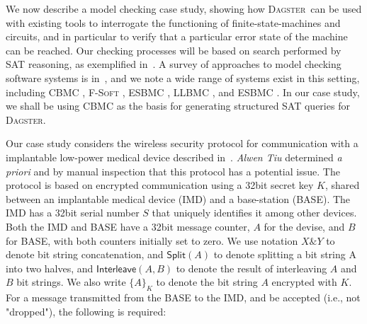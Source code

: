 \documentclass[10pt,a4paper,oneside,headinclude,footinclude,BCOR5mm]{scrartcl}
\newcommand{\dagster}{\textsc{Dagster}\xspace}
\begin{document}
We now describe a model checking case study, showing how \dagster\ can be used with existing tools to interrogate the functioning of finite-state-machines and circuits, and in particular to verify that a particular error state of the machine can be reached.
Our checking processes will be based on search performed by SAT reasoning, as exemplified in~\cite{DBLP:journals/ac/BiereCCSZ03}.
A survey of approaches to model checking software systems is in~\cite{SurveySymExec-CSUR18}, and we note a wide range of systems exist in this setting, including \textsc{CBMC} \cite{DBLP:conf/tacas/ClarkeKL04,10.1007/978-3-642-54862-8_26}, \textsc{F-Soft} \cite{DBLP:journals/tcs/IvancicYGGA08}, \textsc{ESBMC} \cite{DBLP:journals/tse/CordeiroFM12}, \textsc{LLBMC} \cite{DBLP:conf/kbse/FalkeMS13}, and \textsc{ESBMC} \cite{10.1007/s10009-020-00571-2}.
In our case study, we shall be using \textsc{CBMC} as the basis for generating structured SAT queries for \dagster. 

\newcommand{\pp}[1]{\ensuremath{\textsf{#1}}}

Our case study considers the wireless security protocol for communication with a implantable low-power medical device described in~\cite{5759785}. %
{\em Alwen Tiu} determined {\em a priori} and by manual inspection that this protocol has a potential issue.
The protocol is based on encrypted communication using a 32bit secret key $K$, shared between an implantable medical device (IMD) and a base-station (BASE).
The IMD has a 32bit serial number $S$ that uniquely identifies it among other devices.
Both the IMD and BASE have a 32bit message counter,  $A$ for the devise, and $B$ for BASE, with both counters initially set to zero.
We use notation $X\&Y$ to denote bit string concatenation, and $\pp{Split}(A)$ to denote splitting a bit string A into two halves, and $\pp{Interleave}(A,B)$ to denote the result of interleaving $A$ and $B$ bit strings.
We also write $\{A\}_K$ to denote the bit string $A$ encrypted with $K$. For a message transmitted from the BASE to the IMD, and be accepted (i.e., not "dropped"), the following is required:
\end{document}
